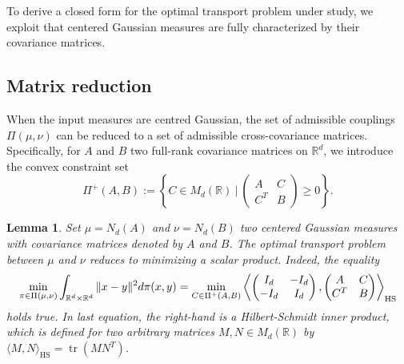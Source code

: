\documentclass[]{article}
\DeclareMathOperator{\tr}{tr}
\DeclareMathOperator{\HS}{HS}
\numberwithin{equation}{section}
\theoremstyle{plain}
\newtheorem{lem}{Lemma}[section]
\begin{document}
To derive a closed form for the optimal transport problem under study, we exploit that centered Gaussian measures are fully characterized by their covariance matrices.

\subsection{Matrix reduction}

When the input measures are centred Gaussian, the set of admissible couplings $\Pi(\mu,\nu)$ can be reduced to a set of admissible cross-covariance matrices. Specifically, for $A$ and $B$ two full-rank covariance matrices on $\mathbb{R}^d$, we introduce the convex constraint set 
\begin{equation}\label{eq:notation_admissible_cov}
	\Pi^{+}(A,B) := \left\{ C \in M_d(\mathbb{R}) ~|~ \begin{pmatrix}
		A & C \\
		C^T& B
	\end{pmatrix} \geq 0 \right\}.
\end{equation}


\begin{lem}\label{lem:linearot_gaussmat}
	Set $\mu=N_d(A)$ and $\nu = N_d(B)$ two centered Gaussian measures with covariance matrices denoted by $A$ and $B$.  The optimal transport problem between $\mu$ and $\nu$ reduces to minimizing a scalar product. Indeed, the equality
	\begin{equation}\label{eq:linearot_gaussmat}
		\min_{\pi \in \Pi(\mu, \nu)} \int_{\mathbb{R}^d \times \mathbb{R}^d} \|x-y\|^2 d \pi(x,y) = \min_{C \in \Pi^{+}(A,B)} \left \langle \begin{pmatrix}
			I_d & -I_d \\
			-I_d & I_d
		\end{pmatrix}, \begin{pmatrix}
			A & C \\
			C^T& B
		\end{pmatrix}  \right \rangle_{\rm HS}
	\end{equation}
	holds true. In last equation, the right-hand is a Hilbert-Schmidt inner product, which is defined for two arbitrary matrices $M, N \in M_d(\mathbb{R})$ by $\langle M, N \rangle_{\HS} = \tr(M N^T)$.
\end{lem}
\end{document}
